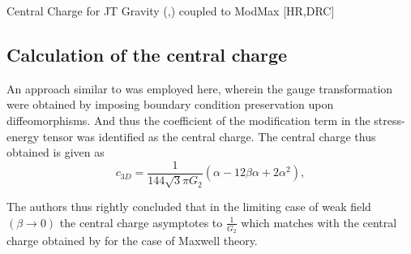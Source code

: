 \begin{frame}[allowframebreaks]{Central Charge for JT Gravity (\cite{jackiw1985lower},\cite{teitelboim1983gravitation}) coupled to ModMax {\color{red}\scriptsize [HR,DRC]\cite{rathi2023ads2}}}
\subsection{Calculation of the central charge}
An approach similar to \cite{Castro:2008ne} was employed here, wherein the gauge transformation were obtained by imposing boundary condition preservation upon diffeomorphisms. And thus the coefficient of the modification term in the stress-energy tensor was identified as the central charge. The central charge thus obtained is given as
\begin{equation}
c_{3D} = \frac{1}{144\sqrt{3}\pi G_2}\left(\alpha - 12\beta\alpha + 2\alpha^2\right),
\end{equation}

The authors thus rightly concluded that in the limiting case of weak field $\left( \beta\to 0 \right) $ the central charge asymptotes to $\displaystyle\frac{1}{G_2}$ which matches with the central charge obtained by \cite{Castro:2008ne} for the case of Maxwell theory.



\end{frame}


